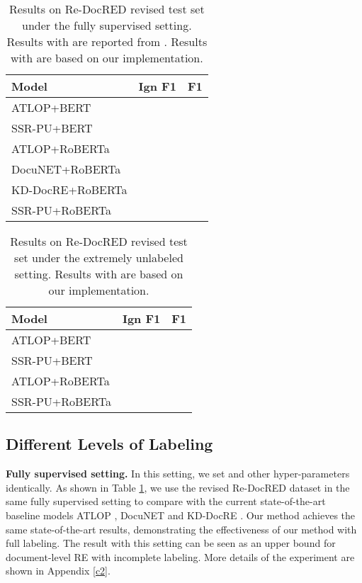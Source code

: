 \documentclass[11pt]{article}
\begin{document}
\begin{table}
\centering
\begin{tabular}{lcc}
\hline \textbf{Model} & \textbf{Ign F1} & \textbf{F1} \\
\hline ATLOP+BERT &  &  \\
SSR-PU+BERT &  &  \\
\hline ATLOP+RoBERTa &  &  \\
DocuNET+RoBERTa &  &  \\
KD-DocRE+RoBERTa &  &  \\
SSR-PU+RoBERTa &  &  \\
\hline
\end{tabular}
\caption{\label{table2}
Results on Re-DocRED revised test set under the fully supervised setting. Results with  are reported from \citep{tan2022revisiting}. Results with  are based on our implementation.
}
\end{table}

\begin{table}
\centering
\begin{tabular}{lcc}
\hline \textbf{Model} & \textbf{Ign F1} & \textbf{F1} \\
\hline ATLOP+BERT &  &  \\
SSR-PU+BERT &  &  \\
\hline ATLOP+RoBERTa &  &  \\
SSR-PU+RoBERTa &  &  \\
\hline
\end{tabular}
\caption{\label{table3}
Results on Re-DocRED revised test set under the extremely unlabeled setting. Results with  are based on our implementation.
}
\end{table}

\subsection{Different Levels of Labeling}

\textbf{Fully supervised setting.} \enspace In this setting, we set  and other hyper-parameters identically. As shown in Table \ref{table2}, we use the \citep{tan2022revisiting} revised Re-DocRED dataset in the same fully supervised setting to compare with the current state-of-the-art baseline models ATLOP \citep{Zhou_Huang_Ma_Huang_2021}, DocuNET \citep{ijcai2021p551} and KD-DocRE \citep{tan-etal-2022-document}. Our method achieves the same state-of-the-art results, demonstrating the effectiveness of our method with full labeling. The result with this setting can be seen as an upper bound for document-level RE with incomplete labeling. More details of the experiment are shown in Appendix \ref{c2}.
\end{document}
